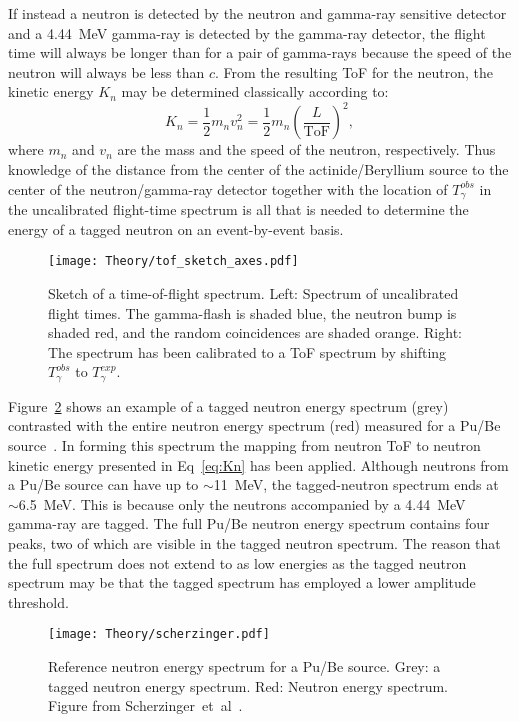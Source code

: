 \documentclass[main.tex]{subfiles}
\begin{document}
If instead a neutron is detected by the neutron and gamma-ray sensitive detector and a \SI{4.44}{\MeV} gamma-ray is detected by the gamma-ray detector, the flight time will always be longer than for a pair of gamma-rays because the speed of the neutron will always be less than $c$. From the resulting ToF for the neutron, the kinetic energy $K_n$ may be determined classically according to:
\begin{equation}
	K_n = \frac{1}{2} m_n v_n^2 = \frac{1}{2}m_n\left(\frac{L}{\textrm{ToF}}\right)^2,
	\label{eq:Kn}
\end{equation}
where $m_n$ and $v_n$ are the mass and the speed of the neutron, respectively.
Thus knowledge of the distance from the center of the actinide/Beryllium source to the center of the neutron/gamma-ray detector together with the location of $T_\gamma^{obs}$ in the uncalibrated flight-time spectrum is all that is needed to determine the energy of a tagged neutron on an event-by-event basis.

\begin{figure}[t]
    \centering
        \texttt{[image: Theory/tof\_sketch\_axes.pdf]}
        \caption[Sketch of a time-of-flight spectrum.]{Sketch of a time-of-flight spectrum. Left: Spectrum of uncalibrated flight times. The gamma-flash is shaded blue, the neutron bump is shaded red, and the random coincidences are shaded orange. Right: The spectrum has been calibrated to a ToF spectrum by shifting $T_\gamma^{obs}$ to $T_\gamma^{exp}.$}
    \label{fig:tof_sketch} 
\end{figure}
Figure~\ref{fig:scherzinger} shows an example of a tagged neutron energy spectrum (grey) contrasted with the entire neutron energy spectrum (red) measured for a Pu/Be source~\cite{ScherzingerPhd}. In forming this spectrum the mapping from neutron ToF to neutron kinetic energy presented in Eq~\ref{eq:Kn} has been applied. Although neutrons from a Pu/Be source can have up to $\sim$\SI{11}{\MeV}, the tagged-neutron spectrum ends at $\sim$\SI{6.5}{\MeV}. This is because only the neutrons accompanied by a \SI{4.44}{\MeV} gamma-ray are tagged. The full Pu/Be neutron energy spectrum contains four peaks, two of which are visible in the tagged neutron spectrum. The reason that the full spectrum does not extend to as low energies as the tagged neutron spectrum may be that the tagged spectrum has employed a lower amplitude threshold.
\begin{figure}[h]
    \centering
        \texttt{[image: Theory/scherzinger.pdf]}
        \caption[Reference neutron energy spectrum for a Pu/Be source.]{Reference neutron energy spectrum for a Pu/Be source. Grey: a tagged neutron energy spectrum. Red: Neutron energy spectrum. Figure from Scherzinger~et~al~\cite{ScherzingerPhd}.}
    \label{fig:scherzinger} 
\end{figure}
\end{document}
